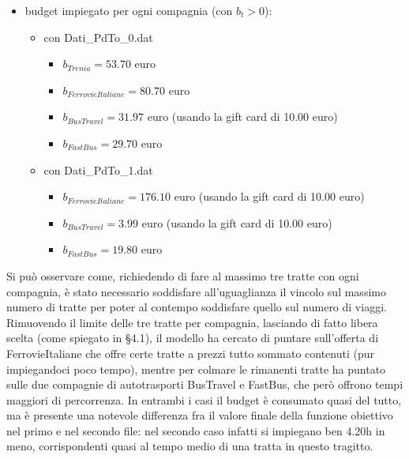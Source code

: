 \documentclass[main.tex]{subfiles}
\begin{document}
\begin{itemize}
\begin{itemize}
\begin{itemize}
        \end{itemize}
    \end{itemize}
    \item budget impiegato per ogni compagnia (con $b_t > 0$):
    \begin{itemize}
        \item con Dati\_PdTo\_0.dat
        \begin{itemize}
            \item $b_{Trenia} = 53.70$ euro
            \item $b_{FerrovieItaliane} = 80.70$ euro
            \item $b_{BusTravel} = 31.97$ euro (usando la gift card di 10.00 euro)
            \item $b_{FastBus} = 29.70$ euro
        \end{itemize}
        \item con Dati\_PdTo\_1.dat
        \begin{itemize}
            \item $b_{FerrovieItaliane} = 176.10$ euro (usando la gift card di 10.00 euro)
            \item $b_{BusTravel} = 3.99$ euro (usando la gift card di 10.00 euro)
            \item $b_{FastBus} = 19.80$ euro
        \end{itemize}
    \end{itemize}
\end{itemize}
Si può osservare come, richiedendo di fare al massimo tre tratte con ogni compagnia, è stato necessario soddisfare all'uguaglianza 
il vincolo sul massimo numero di tratte per poter al contempo soddisfare quello sul numero di viaggi. Rimuovendo il limite delle tre tratte per compagnia,
lasciando di fatto libera scelta (come spiegato in §4.1), il modello ha cercato di puntare sull'offerta di FerrovieItaliane che offre certe tratte a prezzi 
tutto sommato contenuti (pur impiegandoci poco tempo), mentre per colmare le rimanenti tratte ha puntato sulle due compagnie di autotrasporti BusTravel e FastBus, 
che però offrono tempi maggiori di percorrenza. In entrambi i casi il budget è consumato quasi del tutto, ma è presente una notevole differenza fra il valore finale 
della funzione obiettivo nel primo e nel secondo file: nel secondo caso infatti si impiegano ben 4.20h in meno, corrispondenti quasi al tempo medio di una tratta in 
questo tragitto.
\end{document}
